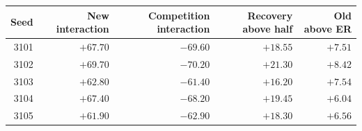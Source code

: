 \begin{tabular}{rrrrr}
\toprule
Seed & New interaction & Competition interaction & Recovery above half & Old above ER\\
\midrule
3101 & $+67.70$ & $-69.60$ & $+18.55$ & $+7.51$\\
3102 & $+69.70$ & $-70.20$ & $+21.30$ & $+8.42$\\
3103 & $+62.80$ & $-61.40$ & $+16.20$ & $+7.54$\\
3104 & $+67.40$ & $-68.20$ & $+19.45$ & $+6.04$\\
3105 & $+61.90$ & $-62.90$ & $+18.30$ & $+6.56$\\
\bottomrule
\end{tabular}

